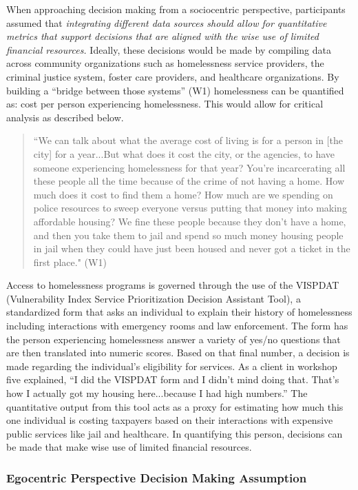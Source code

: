 When approaching decision making from a sociocentric perspective, participants assumed that \textit{integrating different data sources should allow for quantitative metrics that support decisions that are aligned with the wise use of limited financial resources.} Ideally, these decisions would be made by compiling data across community organizations such as homelessness service providers, the criminal justice system, foster care providers, and healthcare organizations. By building a ``bridge between those systems'' (W1) homelessness can be quantified as: cost per person experiencing homelessness. This would allow for critical analysis as described below.

\begin{quote}\singlespacing ``We can talk about what the average cost of living is for a person in [the city] for a year...But what does it cost the city, or the agencies, to have someone experiencing homelessness for that year? You're incarcerating all these people all the time because of the crime of not having a home. How much does it cost to find them a home? How much are we spending on police resources to sweep everyone versus putting that money into making affordable housing? We fine these people because they don't have a home, and then you take them to jail and spend so much money housing people in jail when they could have just been housed and never got a ticket in the first place." (W1) \end{quote}

Access to homelessness programs is governed through the use of the VISPDAT (Vulnerability Index Service Prioritization Decision Assistant Tool), a standardized form that asks an individual to explain their history of homelessness including interactions with emergency rooms and law enforcement. The form has the person experiencing homelessness answer a variety of yes/no questions that are then translated into numeric scores. Based on that final number, a decision is made regarding the individual's eligibility for services. As a client in workshop five explained, ``I did the VISPDAT form and I didn't mind doing that. That's how I actually got my housing here...because I had high numbers.'' The quantitative output from this tool acts as a proxy for estimating how much this one individual is costing taxpayers based on their interactions with expensive public services like jail and healthcare. In quantifying this person, decisions can be made that make wise use of limited financial resources.

\subsubsection{Egocentric Perspective Decision Making Assumption}

